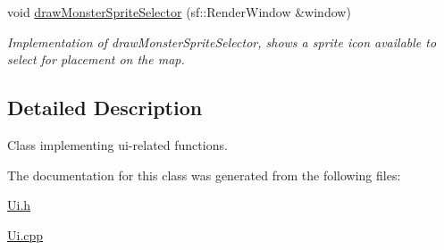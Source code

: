 \begin{DoxyCompactItemize}
\hypertarget{classUi_a2562a4082879f205c5488807a402f8ff}{}\label{classUi_a2562a4082879f205c5488807a402f8ff} 
void \hyperlink{classUi_a2562a4082879f205c5488807a402f8ff}{draw\+Monster\+Sprite\+Selector} (sf\+::\+Render\+Window \&window)
\begin{DoxyCompactList}\small\item\em Implementation of draw\+Monster\+Sprite\+Selector, shows a sprite icon available to select for placement on the map. \end{DoxyCompactList}\end{DoxyCompactItemize}


\subsection{Detailed Description}
Class implementing ui-\/related functions. 

The documentation for this class was generated from the following files\+:\begin{DoxyCompactItemize}
\item 
\hyperlink{Ui_8h}{Ui.\+h}\item 
\hyperlink{Ui_8cpp}{Ui.\+cpp}\end{DoxyCompactItemize}
